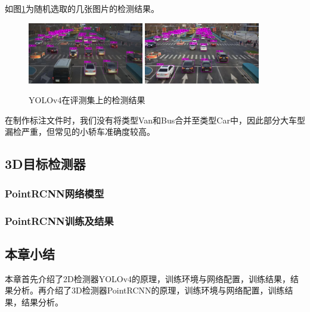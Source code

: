 如图\ref{fig24}为随机选取的几张图片的检测结果。
\begin{figure}[htb] 
    \center
    \includegraphics[width=0.45\textwidth]{figure/fig22.png}
    \includegraphics[width=0.45\textwidth]{figure/fig24.png}
    \caption{YOLOv4在评测集上的检测结果}
    \label{fig24}
\end{figure}
在制作标注文件时，我们没有将类型Van和Bus合并至类型Car中，因此部分大车型漏检严重，但常见的小轿车准确度较高。

\subsection{3D目标检测器}

\subsubsection{PointRCNN网络模型}

\subsubsection{PointRCNN训练及结果}

\subsection{本章小结}

本章首先介绍了2D检测器YOLOv4的原理，训练环境与网络配置，训练结果，结果分析。再介绍了3D检测器PointRCNN的原理，训练环境与网络配置，训练结果，结果分析。